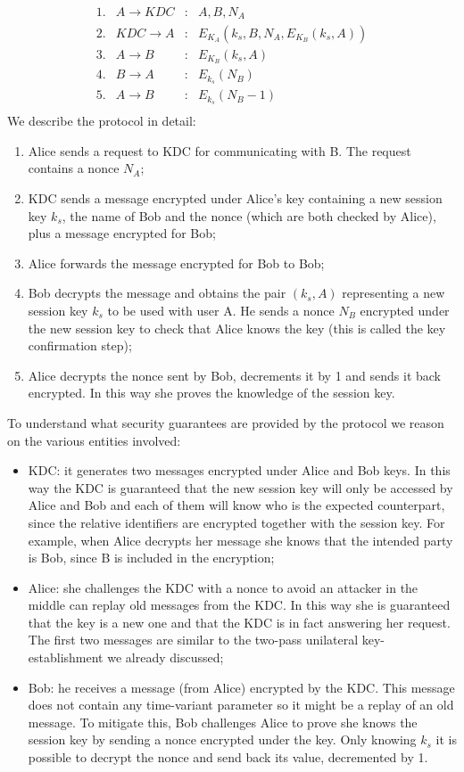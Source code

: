 $$\begin{array}{lrcl} 1. & A \rightarrow KDC & : & A,B,N_A\\ 2. & KDC \rightarrow A & : & E_{K_A}(k_s,B,N_A,E_{K_B}(k_s,A)) \\ 3. & A \rightarrow B & : & E_{K_B}(k_s,A) \\4. & B \rightarrow A & : &E_{k_s}(N_B)\\ 5. & A \rightarrow B & : & E_{k_s}(N_B-1)\\\end{array}$$
We describe the protocol in detail:

\begin{enumerate}
    \item Alice sends a request to KDC for communicating with B. The request contains a nonce $N_A$;
    \item KDC sends a message encrypted under Alice’s key containing a new session key $k_s$, the name of Bob and the nonce (which are both checked by Alice), plus a message encrypted for Bob;
    \item Alice forwards the message encrypted for Bob to Bob;
    \item Bob decrypts the message and obtains the pair $(k_s , A)$ representing a new session key $k_s$ to be used with user A. He sends a nonce $N_B$ encrypted under the new session key to check that Alice knows the key (this is called the key confirmation step);
    \item Alice decrypts the nonce sent by Bob, decrements it by 1 and sends it back encrypted. In this way she proves the knowledge of the session key.
\end{enumerate}

To understand what security guarantees are provided by the protocol we reason on the various entities involved:

\begin{itemize}
    \item KDC: it generates two messages encrypted under Alice and Bob keys. In this way the KDC is guaranteed that the new session key will only be accessed by Alice and Bob and each of them will know who is the expected counterpart, since the relative identifiers are encrypted together with the session key. For example, when Alice decrypts her message she knows that the intended party is Bob, since B is included in the encryption;
    \item Alice: she challenges the KDC with a nonce to avoid an attacker in the middle can replay old messages from the KDC. In this way she is guaranteed that the key is a new one and that the KDC is in fact answering her request. The first two messages are similar to the two-pass unilateral key-establishment we already discussed;
    \item Bob: he receives a message (from Alice) encrypted by the KDC. This message does not contain any time-variant parameter so it might be a replay of an old message. To mitigate this, Bob challenges Alice to prove she knows the session key by sending a nonce encrypted under the key. Only knowing $k_s$ it is possible to decrypt the nonce and send back its value, decremented by 1.
\end{itemize}

